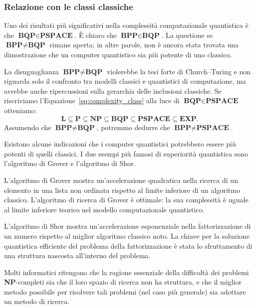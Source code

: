 \subsubsection*{Relazione con le classi classiche}
\label{sec:clas_rel}
Uno dei risultati più significativi nella complessità computazionale quantistica è che $\textbf{BQP} \in \textbf{PSPACE}$. È chiaro che $\textbf{BPP} \in \textbf{BQP}$. La questione se $\textbf{BPP} \neq \textbf{BQP}$ rimane aperta; in altre parole, non è ancora stata trovata una dimostrazione che un computer quantistico sia più potente di uno classico.

La disuguaglianza $\textbf{BPP} \neq \textbf{BQP}$ violerebbe la tesi forte di Church–Turing e non riguarda solo il confronto tra modelli classici e quantistici di computazione, ma avrebbe anche ripercussioni sulla gerarchia delle inclusioni classiche. Se riscriviamo l'Equazione~\ref{eq:complexity_class} alla luce di $\textbf{BQP} \in \textbf{PSPACE}$ otteniamo:
\begin{equation}
	\textbf{L} \subseteq \textbf{P} \subseteq \textbf{NP} \subseteq \textbf{BQP}  \subseteq  \textbf{PSPACE} \subseteq \textbf{EXP}.
	\label{eq:complexity_class_q}
\end{equation}
Assumendo che $\textbf{BPP} \neq \textbf{BQP}$, potremmo dedurre che $\textbf{BPP} \neq \textbf{PSPACE}$.

Esistono alcune indicazioni che i computer quantistici potrebbero essere più potenti di quelli classici. I due esempi più famosi di superiorità quantistica sono l'algoritmo di Grover e l'algoritmo di Shor.

L'algoritmo di Grover mostra un'accelerazione quadratica nella ricerca di un elemento in una lista non ordinata rispetto al limite inferiore di un algoritmo classico. L'algoritmo di ricerca di Grover è ottimale: la sua complessità è uguale al limite inferiore teorico nel modello computazionale quantistico.

L'algoritmo di Shor mostra un'accelerazione esponenziale nella fattorizzazione di un numero rispetto al miglior algoritmo classico noto. La chiave per la soluzione quantistica efficiente del problema della fattorizzazione è stata lo sfruttamento di una struttura nascosta all'interno del problema.

Molti  informatici ritengono che la ragione essenziale della difficoltà dei problemi \textbf{NP}-completi sia che il loro spazio di ricerca non ha struttura, e che il miglior metodo possibile per risolvere tali problemi (nel caso più generale) sia adottare un metodo di ricerca.

